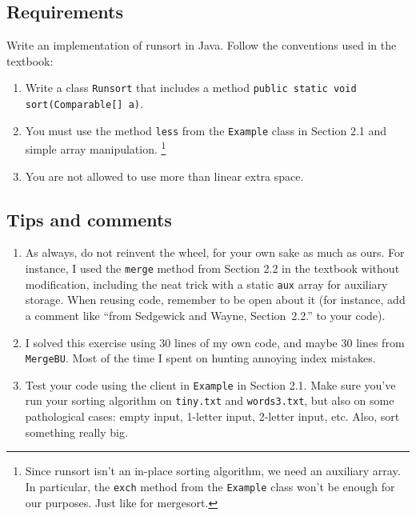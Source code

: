 \documentclass{tufte-handout}
\begin{document}
\subsection{Requirements}
Write an implementation of runsort in Java.
Follow the conventions used in the textbook:
\begin{enumerate}
\item Write a class \texttt{Runsort} that includes a method
\texttt{public static void sort(Comparable[] a)}.
\item You must use the method \texttt{less} from the \texttt{Example} class in Section 2.1 and  simple array manipulation.
\footnote{Since runsort isn't an in-place sorting algorithm, we  need an auxiliary array.
In particular, the \texttt{exch} method from the \texttt{Example} class won't be enough for our purposes.
Just like for mergesort.}
\item You are not allowed to use more than linear extra space.
\end{enumerate}

\subsection{Tips and comments}
\begin{enumerate}
\item As always, do not reinvent the wheel, for your own sake as much as ours.
For instance, I used the \texttt{merge} method from Section 2.2 in the textbook without modification, including the neat trick with a static \texttt{aux} array for auxiliary storage.
When reusing code, remember to be open about it (for instance, add a comment like ``from Sedgewick and Wayne, Section~2.2.'' to your code).
\item I solved this exercise using 30 lines of my own code, and maybe 30 lines from \texttt{MergeBU}.
Most of the time I spent on hunting annoying index mistakes.
\item Test your code using the client in \texttt{Example} in Section 2.1.
Make sure you've run your sorting algorithm on \texttt{tiny.txt} and \texttt{words3.txt}, but also on some pathological cases: empty input, 1-letter input, 2-letter input, etc.
Also, sort something really big.
\end{enumerate}
\end{document}
